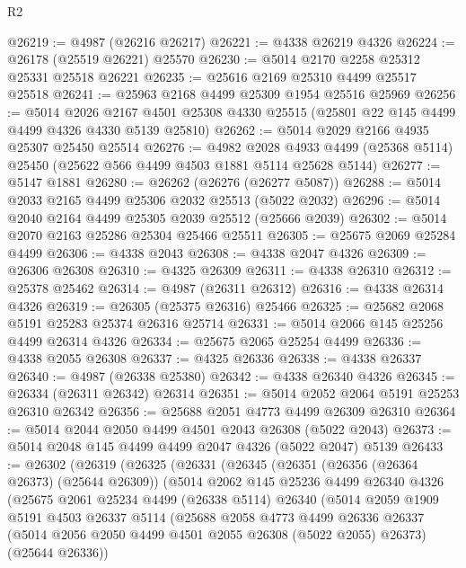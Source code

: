 \begin{lexlean}{R2}
\begin{coremodule}
@26219 := @4987 (@26216 @26217)
@26221 := @4338 @26219 @4326
@26224 := @26178 (@25519 @26221) @25570
@26230 := @5014 @2170 @2258 @25312 @25331 @25518 @26221
@26235 := @25616 @2169 @25310 @4499 @25517 @25518
@26241 := @25963 @2168 @4499 @25309 @1954 @25516 @25969
@26256 := @5014
    @2026
    @2167
    @4501
    @25308
    @4330
    @25515
    (@25801 @22 @145 @4499 @4499 @4326 @4330 @5139 @25810)
@26262 := @5014 @2029 @2166 @4935 @25307 @25450 @25514
@26276 := @4982
    @2028
    @4933
    @4499
    (@25368 @5114)
    @25450
    (@25622 @566 @4499 @4503 @1881 @5114 @25628 @5144)
@26277 := @5147 @1881
@26280 := @26262 (@26276 (@26277 @5087))
@26288 := @5014 @2033 @2165 @4499 @25306 @2032 @25513 (@5022 @2032)
@26296 := @5014 @2040 @2164 @4499 @25305 @2039 @25512 (@25666 @2039)
@26302 := @5014 @2070 @2163 @25286 @25304 @25466 @25511
@26305 := @25675 @2069 @25284 @4499
@26306 := @4338 @2043
@26308 := @4338 @2047 @4326
@26309 := @26306 @26308
@26310 := @4325 @26309
@26311 := @4338 @26310
@26312 := @25378 @25462
@26314 := @4987 (@26311 @26312)
@26316 := @4338 @26314 @4326
@26319 := @26305 (@25375 @26316) @25466
@26325 := @25682 @2068 @5191 @25283 @25374 @26316 @25714
@26331 := @5014 @2066 @145 @25256 @4499 @26314 @4326
@26334 := @25675 @2065 @25254 @4499
@26336 := @4338 @2055 @26308
@26337 := @4325 @26336
@26338 := @4338 @26337
@26340 := @4987 (@26338 @25380)
@26342 := @4338 @26340 @4326
@26345 := @26334 (@26311 @26342) @26314
@26351 := @5014 @2052 @2064 @5191 @25253 @26310 @26342
@26356 := @25688 @2051 @4773 @4499 @26309 @26310
@26364 := @5014 @2044 @2050 @4499 @4501 @2043 @26308 (@5022 @2043)
@26373 := @5014 @2048 @145 @4499 @4499 @2047 @4326 (@5022 @2047) @5139
@26433 := @26302
    (@26319
      (@26325
        (@26331
          (@26345
            (@26351
              (@26356 (@26364 @26373) (@25644 @26309))
              (@5014
                @2062
                @145
                @25236
                @4499
                @26340
                @4326
                (@25675
                  @2061
                  @25234
                  @4499
                  (@26338 @5114)
                  @26340
                  (@5014
                    @2059
                    @1909
                    @5191
                    @4503
                    @26337
                    @5114
                    (@25688
                      @2058
                      @4773
                      @4499
                      @26336
                      @26337
                      (@5014 @2056 @2050 @4499 @4501 @2055 @26308 (@5022 @2055) @26373)
                      (@25644 @26336))

\end{coremodule}
\end{lexlean}
